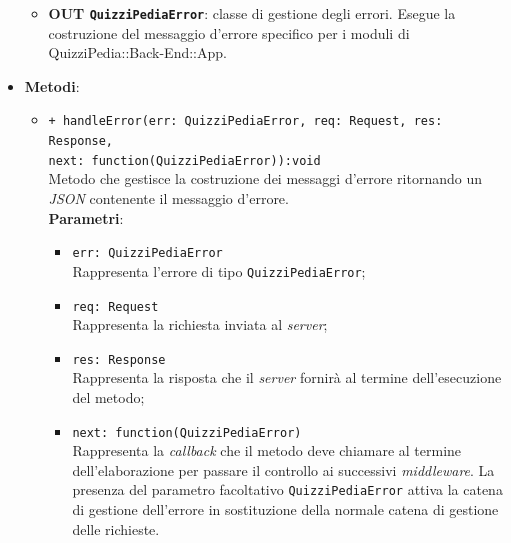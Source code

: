 \begin{itemize}
\begin{itemize}
		\item \textbf{OUT \texttt{QuizziPediaError}}:
		classe di gestione degli errori. Esegue la costruzione del messaggio d'errore specifico per i moduli di QuizziPedia::Back-End::App.
	\end{itemize}
	\item \textbf{Metodi}:
	\begin{itemize}
		\item \texttt{+ handleError(err: QuizziPediaError, req: Request, res: Response, \\next: function(QuizziPediaError)):void}\\
		Metodo che gestisce la costruzione dei messaggi d'errore ritornando un \textit{JSON} contenente il messaggio d'errore.\\
		\textbf{Parametri}:
		\begin{itemize}
			\item \texttt{err: QuizziPediaError}\\
			Rappresenta l'errore di tipo \texttt{QuizziPediaError};
			\item \texttt{req: Request}\\
			Rappresenta la richiesta inviata al \textit{server};
			\item \texttt{res: Response}\\
			Rappresenta la risposta che il \textit{server} fornirà al termine dell'esecuzione del metodo;
			\item \texttt{next: function(QuizziPediaError)}\\
			Rappresenta la \textit{callback} che il metodo deve chiamare al termine dell'elaborazione per passare il controllo ai successivi \textit{middleware}. La presenza del parametro facoltativo \texttt{QuizziPediaError} attiva la catena di gestione dell'errore in sostituzione della normale catena di gestione delle richieste.
		\end{itemize}
	\end{itemize}
\end{itemize}

